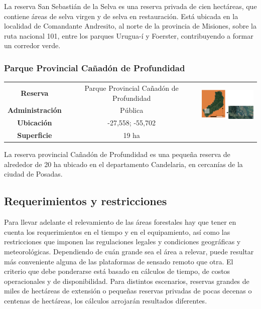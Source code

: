 La reserva San Sebastián de la Selva es una reserva privada de cien hectáreas, que contiene áreas de selva virgen y de selva en restauración. Está ubicada en la localidad de Comandante Andresito, al norte de la provincia de Misiones, sobre la ruta nacional 101, entre los parques Urugua-í y Foerster, contribuyendo a formar un corredor verde.
\subsubsection{Parque Provincial Cañadón de Profundidad}
\begin{table}[H]
\centering
\begin{tabular}{|c|c|c|}
\hline
 \textbf{Reserva} & Parque Provincial Cañadón de Profundidad &   \multirow{ 3}{*}{\includegraphics[width=30mm]{Imagenes/Profundidad.png}}\\ 
\textbf{Administración} & Pública\\
        
        \textbf{Ubicación} & -27,558; -55,702 \\
         
        \textbf{Superficie} & 19 ha\\
\hline        
\end{tabular}

\label{Profundidad}
\end{table}

La reserva provincial Cañadón de Profundidad es una pequeña reserva de alrededor de 20 ha ubicado en el departamento Candelaria, en cercanías de la ciudad de Posadas.

\subsection{Requerimientos y restricciones} \label{Metodo calculo relevamiento}
Para llevar adelante el relevamiento de las áreas forestales hay que tener en cuenta los requerimientos en el tiempo y en el equipamiento, así como las restricciones que imponen las regulaciones legales y condiciones geográficas y meteorológicas. Dependiendo de cuán grande sea el área a relevar, puede resultar más conveniente alguna de las plataformas de sensado remoto que otra. El criterio que debe ponderarse está basado en cálculos de tiempo, de costos operacionales y de disponibilidad. Para distintos escenarios, reservas grandes de miles de hectáreas de extensión o pequeñas reservas privadas de pocas decenas o centenas de hectáreas, los cálculos arrojarán resultados diferentes.
